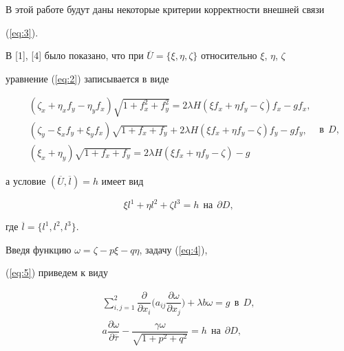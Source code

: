 В этой работе будут даны некоторые критерии корректности внешней связи 


(\ref{eq:3}).





В [1], [4] было показано, что при $\overline U =


\{ {\xi ,\eta ,\zeta } \}$ относительно $\xi$, $\eta$, $\zeta$


уравнение (\ref{eq:2}) записывается в виде


\begin{equation}\label{eq:4}


\begin{split}


&(\zeta _x+\eta _x f_y - \eta _y f_x)\sqrt {1+f_x^2+f_y^2 }=


2\lambda H ({\xi f_x+\eta f_y - \zeta })f_x - gf_x , \\ 


&(\zeta _y - \xi _x f_y+\xi _y f_x)\sqrt {1+f_x+f_y }+2\lambda 


H ({\xi f_x+\eta f_y - \zeta })f_y - gf_y , \\ 


&(\xi _x+\eta _y)\sqrt {1+f_x+f_y }=2\lambda H ({\xi f_x+


\eta f_y - \zeta }) - g


\end{split}


\ \ \text{в}\ \ D,


\end{equation}


а условие $ ({\overline U ,\overline l })=h $ имеет вид


\begin{equation}\label{eq:5}


\xi l^1+\eta l^2+\zeta l^3=h \ \ \text{на}\ \ \partial D,


\end{equation}


где $\overline l=\{ {l^1,l^2,l^3} \}$.





Введя функцию $\omega=\zeta - p\xi - q\eta$, задачу (\ref{eq:4}),


(\ref{eq:5}) приведем к виду


\begin{equation}\label{eq:6}


\begin{split}


\sum\limits_{i,j=1}^2 \dfrac {\partial}{\partial x_i }


\bigg(a_{ij} \dfrac{\partial \omega }{\partial x_j } \bigg)


+ \lambda b\omega=g \ \ \text{в} \ \ D, \\


a\dfrac{\partial \omega }{\partial \overline \tau } - \dfrac{\gamma \omega}


{\sqrt {1+p^2+q^2} }=h \ \ \text{на} \ \ \partial D,


\end{split}


\end{equation}


